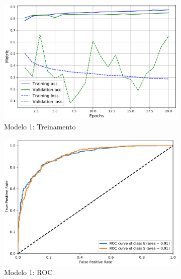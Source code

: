 \begin{figure}[!t]
  \centering
  \begin{subfigure}{.5\textwidth}
    \includegraphics[width=.98\linewidth,left]{figures/sdss_conv_train.pdf}
    \caption{Modelo 1: Treinamento}
    \label{fig:mod1_treinamento}
  \end{subfigure}%
  \begin{subfigure}{.5\textwidth}
    \includegraphics[width=.98\linewidth,right]{figures/roc_sdss_conv.pdf}
    \caption{Modelo 1: ROC}
    \label{fig:mod1_roc}
  \end{subfigure}\\[3mm]
  \begin{subfigure}{.5\textwidth}

\end{subfigure}
\end{figure}
